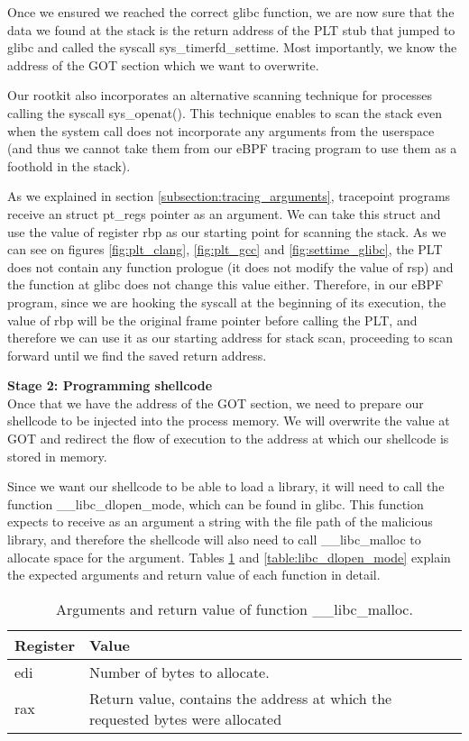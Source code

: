 Once we ensured we reached the correct glibc function, we are now sure that the data we found at the stack is the return address of the PLT stub that jumped to glibc and called the syscall sys\_timerfd\_settime. Most importantly, we know the address of the GOT section which we want to overwrite.

Our rootkit also incorporates an alternative scanning technique for processes calling the syscall sys\_openat(). This technique enables to scan the stack even when the system call does not incorporate any arguments from the userspace (and thus we cannot take them from our eBPF tracing program to use them as a foothold in the stack).

As we explained in section \ref{subsection:tracing_arguments}, tracepoint programs receive an struct pt\_regs pointer as an argument. We can take this struct and use the value of register rbp as our starting point for scanning the stack. As we can see on figures \ref{fig:plt_clang}, \ref{fig:plt_gcc} and \ref{fig:settime_glibc}, the  PLT does not contain any function prologue (it does not modify the value of rsp) and the function at glibc does not change this value either. Therefore, in our eBPF program, since we are hooking the syscall at the beginning of its execution, the value of rbp will be the original frame pointer before calling the PLT, and therefore we can use it as our starting address for stack scan, proceeding to scan forward until we find the saved return address.

\textbf{Stage 2: Programming shellcode}\\
Once that we have the address of the GOT section, we need to prepare our shellcode to be injected into the process memory. We will overwrite the value at GOT and redirect the flow of execution to the address at which our shellcode is stored in memory. 

Since we want our shellcode to be able to load a library, it will need to call the function \_\_libc\_dlopen\_mode, which can be found in glibc. This function expects to receive as an argument a string with the file path of the malicious library, and therefore the shellcode will also need to call \_\_libc\_malloc to allocate space for the argument. Tables \ref{table:libc_malloc} and \ref{table:libc_dlopen_mode} explain the expected arguments and return value of each function in detail.

\begin{table}[htbp]
\begin{tabular}{|>{\centering\arraybackslash}p{4cm}|>{\centering\arraybackslash}p{10cm}|}
\hline
Register & Value\\
\hline
\hline
edi & Number of bytes to allocate. \\
\hline
rax & Return value, contains the address at which the requested bytes were allocated\\
\hline
\end{tabular}
\caption{Arguments and return value of function \_\_libc\_malloc.}
\label{table:libc_malloc}
\end{table}

